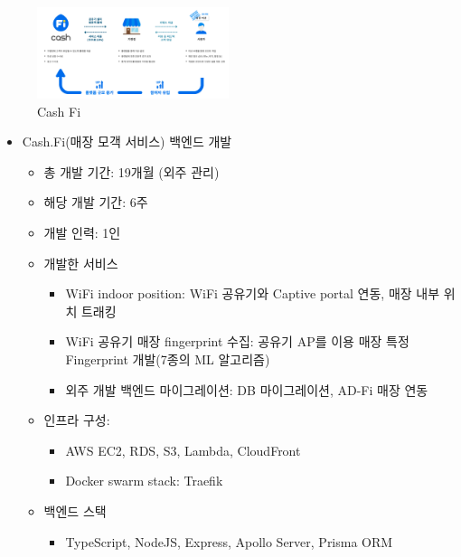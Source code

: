 
\begin{figure}[!ht]
	\begin{fullwidth}
		\parbox{1.6\textwidth}{
			\centering
			\includegraphics[width=0.5\textwidth]{images/cash-fi.png}
			\caption*{Cash Fi}
		}
	\end{fullwidth}
\end{figure}
\begin{itemize}
	\item Cash.Fi(매장 모객 서비스) 백엔드 개발
	      \begin{itemize}[label=$\star$]
		      \item 총 개발 기간: 19개월 (외주 관리)
		      \item 해당 개발 기간: 6주
		      \item 개발 인력: 1인
		      \item 개발한 서비스
		            \begin{itemize}
			            \item WiFi indoor position: WiFi 공유기와 Captive portal 연동, 매장 내부 위치 트래킹
			            \item WiFi 공유기 매장 fingerprint 수집: 공유기 AP를 이용 매장 특정 Fingerprint 개발(7종의 ML 알고리즘)
			            \item 외주 개발 백엔드 마이그레이션: DB 마이그레이션, AD-Fi 매장 연동
		            \end{itemize}
		      \item 인프라 구성:
		            \begin{itemize}
			            \item AWS EC2, RDS, S3, Lambda, CloudFront
			            \item Docker swarm stack: Traefik
		            \end{itemize}
		      \item 백엔드 스택
		            \begin{itemize}
			            \item TypeScript, NodeJS, Express, Apollo Server, Prisma ORM
		            \end{itemize}
	      \end{itemize}
\end{itemize}